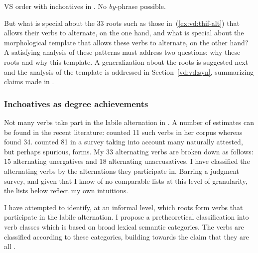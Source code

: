 \begin{exe}
\begin{xlist}
\begin{xlist}
\begin{exe}
\begin{exe}
\begin{xlist}
\begin{exe}
\begin{xlist}
\begin{exe}
\begin{xlist}
 \z
 \ex \label{ex:vd:vs} VS order with {\thif} inchoatives in \thif. No \emph{by}-phrase possible. 
 \begin{xlist} 
	
	
	
 \z
\z 

But what is special about the 33 roots such as those in~(\ref{ex:vd:thif-alt}) that allows their verbs to alternate, on the one hand, and what is special about the morphological template that allows these verbs to alternate, on the other hand? A satisfying analysis of these patterns must address two questions: why these roots and why this template. A generalization about the roots is suggested next and the analysis of the template is addressed in Section~\ref{vd:vd:syn}, summarizing claims made in \cite{kastner19tlr}.

		\subsubsection{Inchoatives as degree achievements} \label{vd:thif:inch:roots}
Not many verbs take part in the labile alternation in {\thit}. A number of estimates can be found in the recent literature: \cite{arad05} counted 11 such verbs in her corpus whereas \cite{laks11} found 34. \cite{lev16} counted 81 in a survey taking into account many naturally attested, but perhaps spurious, forms. My 33 alternating verbs are broken down as follows: 15 alternating unergatives and 18 alternating unaccusatives. I have classified the alternating verbs by the alternations they participate in. Barring a judgment survey, and given that I know of no comparable lists at this level of granularity, the lists below reflect my own intuitions.

I have attempted to identify, at an informal level, which roots form verbs that participate in the labile alternation. I propose a pretheoretical classification into verb classes which is based on broad lexical semantic categories. The verbs are classified according to these categories, building towards the claim that they are all .


\end{xlist}
\end{xlist}
\end{exe}
\end{xlist}
\end{exe}
\end{xlist}
\end{exe}
\end{exe}
\end{xlist}
\end{xlist}
\end{exe}
